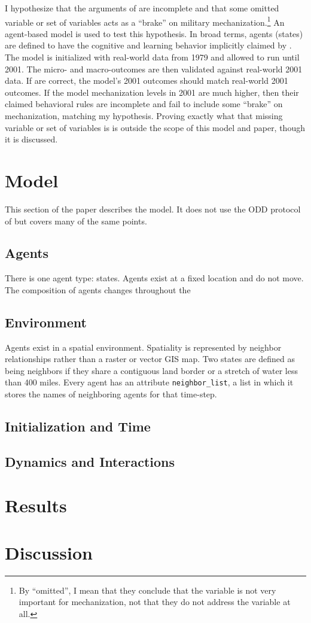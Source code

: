 \documentclass{article}
\begin{document}
I hypothesize that the arguments of \cite{sechser2010army} are incomplete and
that some omitted variable or set of variables acts as a ``brake'' on military
mechanization.\footnote{By ``omitted'', I mean that they conclude that the variable
is not very important for mechanization, not that they do not address the
variable at all.} An agent-based model is used to test this hypothesis. In broad
terms, agents (states) are defined to have the cognitive and learning behavior
implicitly claimed by \cite{sechser2010army}. The model is initialized with
real-world data from 1979 and allowed to run until 2001. The micro- and
macro-outcomes are then validated against real-world 2001 data. If
\cite{sechser2010army} are correct, the model's 2001 outcomes should match
real-world 2001 outcomes. If the model mechanization levels in 2001 are much
higher, then their claimed behavioral rules are incomplete and fail to include
some ``brake'' on mechanization, matching my hypothesis. Proving exactly what
that missing variable or set of variables is is outside the scope of this model
and paper, though it is discussed.

\section{Model}

This section of the paper describes the model. It does not use the ODD protocol
of \cite{grimm2006standard} but covers many of the same points.

\subsection{Agents}

There is one agent type: states. Agents exist at a fixed location and do not
move. The composition of agents changes throughout the 

\subsection{Environment}

Agents exist in a spatial environment. Spatiality is represented by neighbor
relationships rather than a raster or vector GIS map. Two states are defined as
being neighbors if they share a contiguous land border or a stretch of water
less than 400 miles. Every agent has an attribute \texttt{neighbor\_list}, a
list in which it stores the names of neighboring agents for that time-step. 

\subsection{Initialization and Time}

\subsection{Dynamics and Interactions}

\section{Results}

\section{Discussion}
\printbibliography[heading=bibnumbered]
\end{document}
